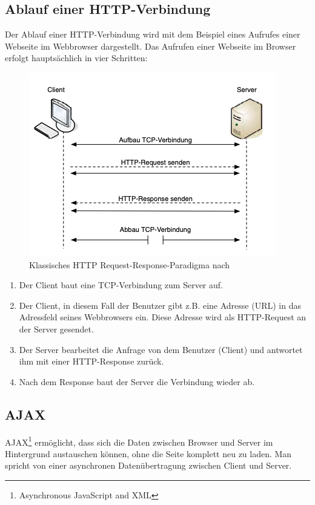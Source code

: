 \subsection{Ablauf einer HTTP-Verbindung}
\label{sec:ablauf einer http-verbindung}
Der Ablauf einer HTTP-Verbindung wird mit dem Beispiel eines Aufrufes einer Webseite im Webbrowser dargestellt. Das Aufrufen einer Webseite im Browser erfolgt hauptsächlich in vier Schritten:

\begin{figure}[H]
  \begin{center}
    \includegraphics[scale=0.5]{img/http-request-response}
	\caption{Klassisches HTTP Request-Response-Paradigma nach \cite{Wöhr2004}}
	\label{fig:http-request-response}
  \end{center}   
\end{figure}

\newpage
\begin{enumerate}
\item Der Client baut eine TCP-Verbindung zum Server auf.
\item Der Client, in diesem Fall der Benutzer gibt z.B. eine Adresse (URL) in das Adressfeld seines Webbrowsers ein. Diese Adresse wird als HTTP-Request an der Server gesendet.
\item Der Server bearbeitet die Anfrage von dem Benutzer (Client) und antwortet ihm mit einer HTTP-Response zurück.
\item Nach dem Response baut der Server die Verbindung wieder ab.
\end{enumerate}

\subsection{AJAX}
\label{sec:ajax}
AJAX\footnote{Asynchronous JavaScript and XML} ermöglicht, dass sich die Daten zwischen Browser und Server im Hintergrund austauschen können, ohne die Seite komplett neu zu laden. Man spricht von einer asynchronen Datenübertragung zwischen Client und Server.\bigskip

